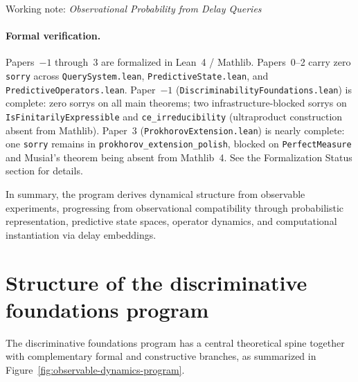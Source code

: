 \documentclass[11pt]{article}
\begin{document}
\begin{center}
Working note: \emph{Observational Probability from Delay Queries}
\end{center}

\paragraph{Formal verification.}
Papers~$-1$ through~3 are formalized in Lean~4 / Mathlib.
Papers~0--2 carry zero \texttt{sorry} across
\texttt{QuerySystem.lean}, \texttt{PredictiveState.lean}, and
\texttt{PredictiveOperators.lean}.
Paper~$-1$ (\texttt{DiscriminabilityFoundations.lean}) is complete:
zero sorrys on all main theorems; two infrastructure-blocked sorrys on
\texttt{IsFinitarilyExpressible} and \texttt{ce\_irreducibility}
(ultraproduct construction absent from Mathlib).
Paper~3 (\texttt{ProkhorovExtension.lean}) is nearly complete: one
\texttt{sorry} remains in \texttt{prokhorov\_extension\_polish},
blocked on \texttt{PerfectMeasure} and Musia\l's theorem being absent
from Mathlib~4.  See the Formalization Status section for details.

In summary, the program derives dynamical structure from observable
experiments, progressing from observational compatibility through
probabilistic representation, predictive state spaces, operator
dynamics, and computational instantiation via delay embeddings.

\section{Structure of the discriminative foundations program}

The discriminative foundations program has a central theoretical spine together
with complementary formal and constructive branches, as summarized in
Figure~\ref{fig:observable-dynamics-program}.
\end{document}
